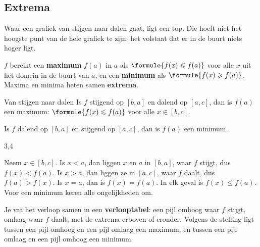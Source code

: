 \subsection{Extrema}

Waar een grafiek van stijgen naar dalen gaat, ligt een top. Die hoeft niet het hoogste punt van de hele grafiek te zijn: het volstaat dat er in de buurt niets hoger ligt.

\begin{theorie}
$f$ bereikt een \textbf{\textcolor{accent}{maximum}} $f(a)$ in $a$ als $\formule{f(x) \leqslant f(a)}$ voor alle $x$ uit het domein in de buurt van $a$, en een \textbf{\textcolor{accent}{minimum}} als $\formule{f(x) \geqslant f(a)}$. Maxima en minima heten samen \textbf{\textcolor{accent}{extrema}}.

\begin{stelling}{Van stijgen naar dalen}
Is $f$ stijgend op $[b, a]$ en dalend op $[a, c]$, dan is $f(a)$ een maximum: $\formule{f(x) \leqslant f(a)}$ voor alle $x \in [b, c]$.

Is $f$ dalend op $[b, a]$ en stijgend op $[a, c]$, dan is $f(a)$ een minimum.
\end{stelling}

\begin{alleenvoor}{3,4}
\begin{bewijs}
Neem $x \in [b, c]$. Is $x < a$, dan liggen $x$ en $a$ in $[b, a]$, waar $f$ stijgt, dus $f(x) < f(a)$. Is $x > a$, dan liggen ze in $[a, c]$, waar $f$ daalt, dus $f(a) > f(x)$. Is $x = a$, dan is $f(x) = f(a)$. In elk geval is $f(x) \leqslant f(a)$. Voor een minimum keren alle ongelijkheden om.
\end{bewijs}
\end{alleenvoor}
\end{theorie}

Je vat het verloop samen in een \textbf{verlooptabel}: een pijl omhoog waar $f$ stijgt, omlaag waar $f$ daalt, met de extrema erboven of eronder. Volgens de stelling ligt tussen een pijl omhoog en een pijl omlaag een maximum, en tussen een pijl omlaag en een pijl omhoog een minimum.

